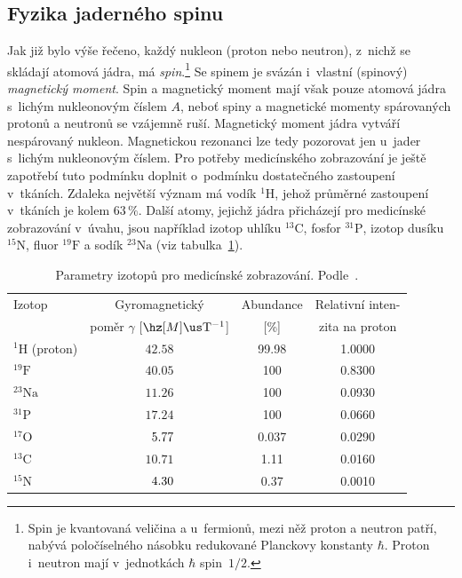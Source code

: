 \subsection{Fyzika jaderného spinu}\label{nuclespin}%

Jak již bylo výše řečeno, každý nukleon (proton nebo neutron), z~nichž se
skládají atomová jádra, má \emph{spin}.\footnote{Spin je kvantovaná veličina a
  u~fermionů, mezi něž proton a neutron patří, nabývá poločíselného násobku
  redukované Planckovy konstanty $\hbar$. Proton i~neutron mají v~jednotkách
  $\hbar$ spin~$1/2$.}  Se spinem je svázán i~vlastní (spinový)
\emph{magnetický moment}. Spin a magnetický moment mají však pouze atomová
jádra s~lichým nukleonovým číslem $A$, neboť spiny a magnetické momenty
spárovaných protonů a neutronů se vzájemně ruší.  Magnetický moment jádra
vytváří nespárovaný nukleon. Magnetickou rezonanci lze tedy pozorovat jen
u~jader s~lichým nukleonovým číslem. Pro potřeby medicínského zobrazování je
ještě zapotřebí tuto podmínku doplnit o~podmínku dostatečného zastoupení
v~tkáních. Zdaleka největší význam má vodík ${}^{1}\mathrm{H}$, jehož průměrné
zastoupení v~tkáních je kolem $63\,\%$.  Další atomy, jejichž jádra přicházejí
pro medicínské zobrazování v~úvahu, jsou například izotop uhlíku
${}^{13}\mathrm{C}$, fosfor ${}^{31}\mathrm{P}$, izotop dusíku
${}^{15}\mathrm{N}$, fluor ${}^{19}\mathrm{F}$ a sodík ${}^{23}\mathrm{Na}$
(viz tabulka~\ref{tablarm}).

\begin{table}[p]
  \caption[Parametry izotopů pro medicínské zobrazování]%
  {\label{tablarm}Parametry izotopů pro medicínské zobrazování.
    Podle~\cite{Hor:LIVE:BasicsMRI:,Dow-Ken-Joh:2006:PhysDiagImag:}.}
\begin{center}
\small
\newcommand{\pad}{\hphantom{0}}
\begin{tabular}{lccc}
\hline
Izotop & Gyromagnetický & Abundance & Relativní inten- \\
       & poměr $\gamma$ [$\hz[M]\us\mathrm{T^{-1}}$] & [\%] &zita na proton\\\hline
${}^{1}\mathrm{H}$ (proton) & $42.58$ & \hphantom{0}99.98\hphantom{0}&1.0000 \\
${}^{19}\mathrm{F}$         & $40.05$ & 100\hphantom{.000} & 0.8300 \\
${}^{23}\mathrm{Na}$        & $11.26$ & 100\hphantom{.000} & 0.0930 \\
${}^{31}\mathrm{P}$         & $17.24$ & 100\hphantom{.000} & 0.0660 \\
${}^{17}\mathrm{O}$      & $\pad5.77$ & \hphantom{00}0.037  & 0.0290 \\
${}^{13}\mathrm{C}$         & $10.71$ & \hphantom{00}1.11\hphantom{0}&0.0160 \\
${}^{15}\mathrm{N}$      & $\pad4.30$ & \hphantom{00}0.37\hphantom{0}&0.0010 \\
\hline
\end{tabular}
\end{center}
\end{table}

